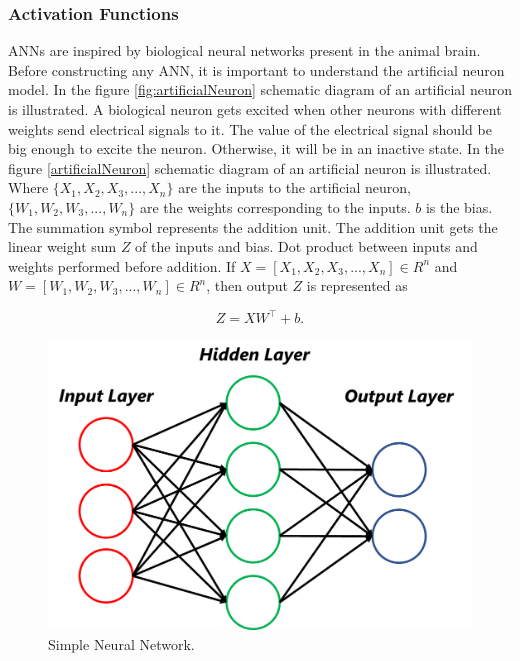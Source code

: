 \subsubsection{Activation Functions}


\acp{ANN} are inspired by biological neural networks present in the animal brain. Before constructing any \ac{ANN}, it is important to understand the artificial neuron model. In the figure \ref{fig:artificialNeuron} schematic diagram of an artificial neuron is illustrated. A biological neuron gets excited when other neurons with different weights send electrical signals to it. The value of the electrical signal should be big enough to excite the neuron. Otherwise, it will be in an inactive state. In the figure \ref{artificialNeuron} schematic diagram of an artificial neuron is illustrated. Where $\{X_1, X_2, X_3, ..., X_n\}$ are the inputs to the artificial neuron, $\{W_1, W_2, W_3, ..., W_n\}$ are the weights corresponding to the inputs. $b$ is the bias. The summation symbol represents the addition unit. The addition unit gets the linear weight sum $Z$ of the inputs and bias. Dot product between inputs and weights performed before addition. If $X = [X_1, X_2, X_3, ..., X_n]  \in R^{n}$  and  $W = [W_1, W_2, W_3, ..., W_n] \in R^{n}$, then output $Z$ is represented as

\begin{equation}\label{linearRegression}
Z=X{W}^\intercal + b.
\end{equation}

\begin{figure}[H]
        \begin{center}
	    \includegraphics[scale=0.30]{images/Fundamentals/ann.png}
	    \caption[Simple Neural Network.]{Simple Neural Network.}
	    \label{fig:ann}
	    \end{center}
\end{figure}

